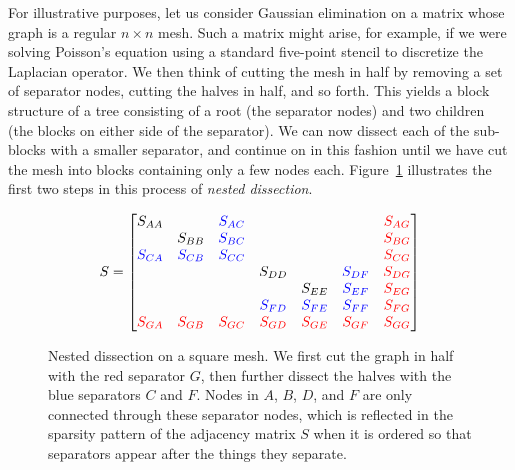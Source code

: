 \documentclass[12pt, leqno]{article} %
\begin{document}
For illustrative purposes, let us consider Gaussian elimination on a
matrix whose graph is a regular $n \times n$ mesh.  Such a matrix
might arise, for example, if we were solving Poisson's equation using
a standard five-point stencil to discretize the Laplacian operator.
We then think of cutting the mesh in half by removing a set of
separator nodes, cutting the halves in half, and so forth.  This
yields a block structure of a tree consisting of a root (the separator
nodes) and two children (the blocks on either side of the separator).
We can now dissect each of the sub-blocks with a smaller separator,
and continue on in this fashion until we have cut the mesh into blocks
containing only a few nodes each.  Figure~\ref{fig1} illustrates the
first two steps in this process of {\em nested dissection}.

\begin{figure}
\begin{center}

\[
  S =
  \begin{bmatrix}
    S_{AA} &        & {\color[rgb]{0,0,1}S_{AC}} &      &        &       & {\color[rgb]{1,0,0}S_{AG}} \\
           & S_{BB} & {\color[rgb]{0,0,1}S_{BC}} &      &        &       & {\color[rgb]{1,0,0}S_{BG}} \\
    {\color[rgb]{0,0,1}S_{CA}} & {\color[rgb]{0,0,1}S_{CB}} & {\color[rgb]{0,0,1} S_{CC}} &       &        &       & {\color[rgb]{1,0,0}S_{CG}} \\
           &       &       & S_{DD} &        & {\color[rgb]{0,0,1}S_{DF}} & {\color[rgb]{1,0,0}S_{DG}} \\
           &       &       &       & S_{EE} & {\color[rgb]{0,0,1}S_{EF}} & {\color[rgb]{1,0,0}S_{EG}} \\
           &       &       & {\color[rgb]{0,0,1}S_{FD}} & {\color[rgb]{0,0,1}S_{FE}} & {\color[rgb]{0,0,1}S_{FF}} & {\color[rgb]{1,0,0}S_{FG}} \\
    {\color[rgb]{1,0,0}S_{GA}} & {\color[rgb]{1,0,0}S_{GB}} & {\color[rgb]{1,0,0}S_{GC}} & {\color[rgb]{1,0,0}S_{GD}} & {\color[rgb]{1,0,0}S_{GE}} & {\color[rgb]{1,0,0}S_{GF}} & {\color[rgb]{1,0,0}S_{GG}}
  \end{bmatrix}
\]
\end{center}
\caption{Nested dissection on a square mesh.  We first cut the graph in half
         with the red separator $G$, then further dissect the halves with the
         blue separators $C$ and $F$.  Nodes in $A$, $B$, $D$, and $F$ are only
         connected through these separator nodes, which is reflected in the
         sparsity pattern of the adjacency matrix $S$ when it is ordered so that
         separators appear after the things they separate.}
\label{fig1}
\end{figure}
\end{document}
